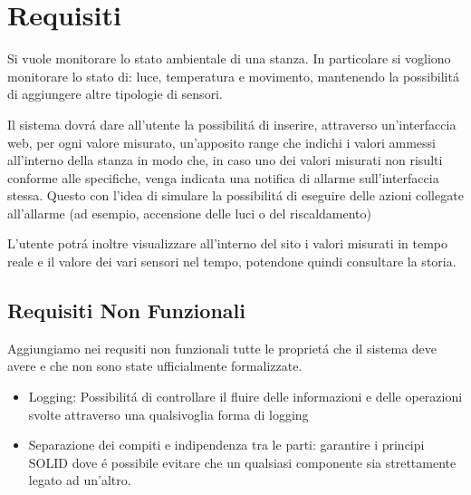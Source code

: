 \section{Requisiti}

Si vuole monitorare lo stato ambientale di una stanza. In particolare si vogliono monitorare lo stato di: luce, temperatura e movimento, mantenendo la possibilit\'a di aggiungere altre tipologie di sensori.

Il sistema dovr\'a dare all'utente la possibilit\'a di inserire, attraverso un'interfaccia web, per ogni valore misurato, un'apposito range che indichi i valori ammessi all'interno della stanza in modo che, in caso uno dei valori misurati non risulti conforme alle specifiche, venga indicata una notifica di allarme sull'interfaccia stessa. Questo con l'idea di simulare la possibilit\'a di eseguire delle azioni collegate all'allarme (ad esempio, accensione delle luci o del riscaldamento)

L'utente potr\'a inoltre visualizzare all'interno del sito i valori misurati in tempo reale e il valore dei vari sensori nel tempo, potendone quindi consultare la storia.

\subsection{Requisiti Non Funzionali}

Aggiungiamo nei requsiti non funzionali tutte le propriet\'a che il sistema deve avere e che non sono state ufficialmente formalizzate.

\begin{itemize}
  \item Logging: Possibilit\'a di controllare il fluire delle informazioni e delle operazioni svolte attraverso una qualsivoglia forma di logging
  \item Separazione dei compiti e indipendenza tra le parti: garantire i principi SOLID dove \'e possibile evitare che un qualsiasi componente sia strettamente legato ad un'altro.
\end{itemize}
